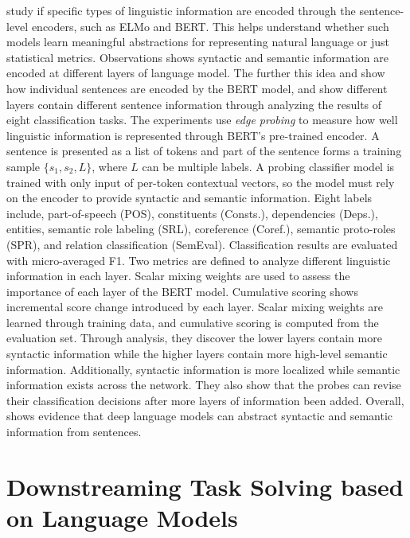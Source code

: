 \documentclass[11pt,a4paper]{article}
\begin{document}
\cite{tenney2019bert} study if specific types of linguistic information are encoded through the sentence-level encoders, such as ELMo and BERT. This helps understand whether such models learn meaningful abstractions for representing natural language or just statistical metrics. Observations shows syntactic and semantic information are encoded at different layers of language model. The further this idea and show how individual sentences are encoded by the BERT model, and show different layers contain different sentence information through analyzing the results of eight classification tasks. The experiments use \textit{edge probing} to measure how well linguistic information is represented through BERT's pre-trained encoder. A sentence is presented as a list of tokens and part of the sentence forms a training sample $\{s_1, s_2, L\}$, where \textit{$L$} can be multiple labels. A probing classifier model is trained with only input of per-token contextual vectors, so the model must rely on the encoder to provide syntactic and semantic information. Eight labels include, part-of-speech (POS), constituents (Consts.), dependencies (Deps.), entities, semantic role labeling (SRL), coreference (Coref.), semantic proto-roles (SPR), and relation classification (SemEval). Classification results are evaluated with micro-averaged F1. Two metrics are defined to analyze different linguistic information in each layer. Scalar mixing weights are used to assess the importance of each layer of the BERT model. Cumulative scoring shows incremental score change introduced by each layer. Scalar mixing weights are learned through training data, and cumulative scoring is computed from the evaluation set. Through analysis, they discover the lower layers contain more syntactic information while the higher layers contain more high-level semantic information. Additionally, syntactic information is more localized while semantic information exists across the network. They also show that the probes can revise their classification decisions after more layers of information been added. Overall, \cite{tenney2019bert} shows evidence that deep language models can abstract syntactic and semantic information from sentences.

\section{Downstreaming Task Solving based on Language Models}

\end{document}
